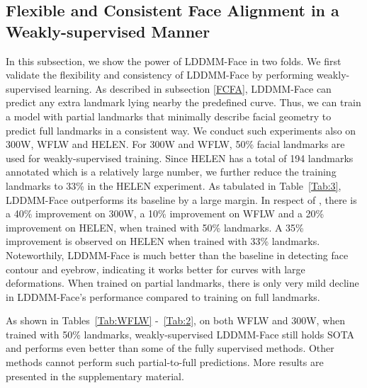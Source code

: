 \documentclass[10pt,twocolumn,letterpaper]{article}
\begin{document}
\subsection{Flexible and Consistent Face Alignment in a Weakly-supervised Manner}
\label{weakly-supervised}
In this subsection, we show the power of LDDMM-Face in two folds. We first validate the flexibility and consistency of LDDMM-Face by performing weakly-supervised learning. As described in subsection \ref{FCFA}, LDDMM-Face can predict any extra landmark lying nearby the predefined curve. Thus, we can train a model with partial landmarks that minimally describe facial geometry to predict full landmarks in a consistent way. We conduct such experiments also on 300W, WFLW and HELEN. For 300W and WFLW, 50\% facial landmarks are used for weakly-supervised training. Since HELEN has a total of 194 landmarks annotated which is a relatively large number, we further reduce the training landmarks to 33\% in the HELEN experiment. As tabulated in Table~\ref{Tab:3}, LDDMM-Face outperforms its baseline by a large margin. In respect of , there is a 40\% improvement on 300W, a 10\% improvement on WFLW and a 20\% improvement on HELEN, when trained with 50\% landmarks. A 35\% improvement is observed on HELEN when trained with 33\% landmarks. Noteworthily, LDDMM-Face is much better than the baseline in detecting face contour and eyebrow, indicating it works better for curves with large deformations. When trained on partial landmarks, there is only very mild decline in LDDMM-Face's performance compared to training on full landmarks. 

As shown in Tables~\ref{Tab:WFLW} -~\ref{Tab:2}, on both
WFLW and 300W, when trained with 50\% landmarks, weakly-supervised LDDMM-Face still holds SOTA and performs even better than some of the fully supervised methods. Other methods cannot perform such partial-to-full predictions. More results are presented in the supplementary material.
\end{document}
